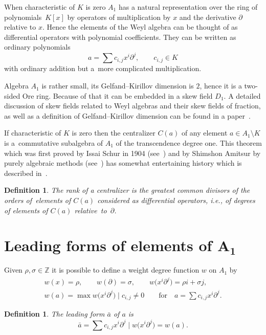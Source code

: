 \documentclass[10pt,a4paper]{amsart}
\numberwithin{equation}{section}
\newtheorem{Definition}[Theorem]{Definition}
\newcommand{\de}{\partial}
\newcommand{\Z}{\mathbb Z}
\begin{document}
When characteristic of $K$ is zero $A_1$ has a
natural representation over the ring of polyno\-mi\-als~$K[x]$ by operators of
multiplication by $x$ and the derivative $\de$ relative to $x$. Hence the
elements of the Weyl algebra can be thought of as differential operators
with polynomial coefficients. They can be written as ordinary polynomials
\[
a= \sum c_{i,j}x^i\de^j,\qquad c_{i,j} \in K
\]
with ordinary addition but a~more complicated
multiplication.

Algebra $A_1$ is rather small, its Gelfand--Kirillov dimension is $2$, hence it is a two-sided Ore ring. Because of that it can be embedded in a skew field $D_1$. A detailed discussion of skew fields related to Weyl algebras and their skew fields of fraction, as well as a definition of Gelfand--Kirillov dimension can be found in a paper~\cite{GK}.

If characteristic of $K$ is zero then the centralizer $C(a)$ of any
element $a \in A_1\setminus K$ is a~com\-mutative subalgebra of $A_1$ of the transcendence degree one. This
theorem which was first proved by Issai Schur in 1904 (see~\cite{S}) and by Shimshon Amitsur by purely algebraic methods (see~\cite{A}) has somewhat
entertaining history which is described in~\cite{ML}.

\begin{Definition}
The rank of a centralizer is the greatest common divisors of the orders of~elements of $C(a)$ considered as differential operators,
i.e., of degrees of elements of $C(a)$ rela\-tive~to~$\de$.
\end{Definition}

\section[Leading forms of elements of A1]{Leading forms of elements of $\boldsymbol{A_1}$}\label{3a}

Given $\rho, \sigma \in \Z$ it is possible to define a weight degree function $w$ on $A_1$ by
\begin{gather*}
w(x) = \rho,\qquad
w(\de) = \sigma, \qquad
w\big(x^i\de^j\big) = \rho i + \sigma j,
\\
w(a) = \max w\big(x^i\de^j\big)\mid c _{i,j} \neq 0\qquad \text{for}\quad a = \sum c_{i,j}x^i\de^j.
\end{gather*}

\begin{Definition}
 The leading form $\bar{a}$ of $a$ is
 \[
 \bar{a} = \sum c_{i,j}x^i\de^j\mid w\big(x^i\de^j\big) = w(a).
 \]
\end{Definition}
\end{document}
